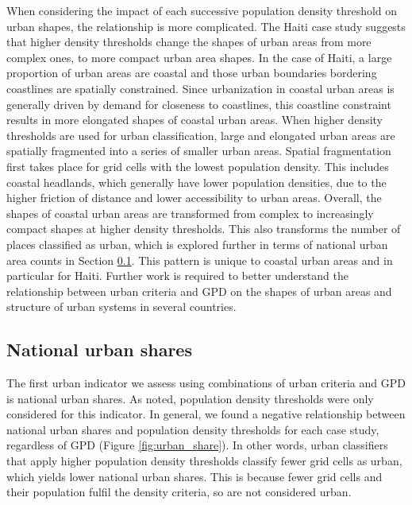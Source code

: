\documentclass[review]{elsarticle}
\begin{document}
	When considering the impact of each successive population density threshold on urban shapes, the relationship is more complicated.
	The Haiti case study suggests that higher density thresholds change the shapes of urban areas from more complex ones, to more compact urban area shapes.
	In the case of Haiti, a large proportion of urban areas are coastal and those urban boundaries bordering coastlines are spatially constrained.
	Since urbanization in coastal urban areas is generally driven by demand for closeness to coastlines, this coastline constraint results in more elongated shapes of coastal urban areas.
	When higher density thresholds are used for urban classification, large and elongated urban areas are spatially fragmented into a series of smaller urban areas.
	Spatial fragmentation first takes place for grid cells with the lowest population density.
	This includes coastal headlands, which generally have lower population densities, due to the higher friction of distance and lower accessibility to urban areas.
	Overall, the shapes of coastal urban areas are transformed from complex to increasingly compact shapes at higher density thresholds.
	This also transforms the number of places classified as urban, which is explored further in terms of national urban area counts in Section \ref{S:nus}.
	This pattern is unique to coastal urban areas and in particular for Haiti. 
	Further work is required to better understand the relationship between urban criteria and GPD on the shapes of urban areas and structure of urban systems in several countries.
	
	\subsection{National urban shares}
	\label{S:nus}
	
	The first urban indicator we assess using combinations of urban criteria and GPD is national urban shares.
	As noted, population density thresholds were only considered for this indicator.
	In general, we found a negative relationship between national urban shares and population density thresholds for each case study, regardless of GPD (Figure \ref{fig:urban_share}).
	In other words, urban classifiers that apply higher population density thresholds classify fewer grid cells as urban, which yields lower national urban shares.
	This is because fewer grid cells and their population fulfil the density criteria, so are not considered urban.
	
\end{document}
